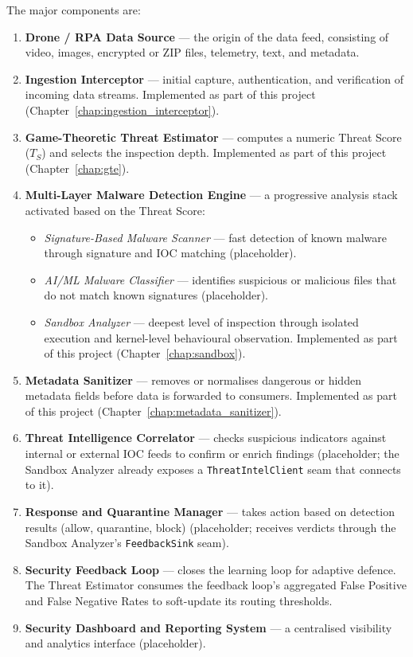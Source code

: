 \documentclass[12pt, a4paper]{report}
\begin{document}
The major components are:
\begin{enumerate}
    \item \textbf{Drone / RPA Data Source} --- the origin of the data feed,
          consisting of video, images, encrypted or ZIP files, telemetry,
          text, and metadata.
    \item \textbf{Ingestion Interceptor} --- initial capture,
          authentication, and verification of incoming data streams.
          Implemented as part of this project
          (Chapter~\ref{chap:ingestion_interceptor}).
    \item \textbf{Game-Theoretic Threat Estimator} --- computes a numeric
          Threat Score ($T_S$) and selects the inspection depth.
          Implemented as part of this project (Chapter~\ref{chap:gte}).
    \item \textbf{Multi-Layer Malware Detection Engine} --- a progressive
          analysis stack activated based on the Threat Score:
          \begin{itemize}
              \item \emph{Signature-Based Malware Scanner} --- fast
                    detection of known malware through signature and IOC
                    matching (placeholder).
              \item \emph{AI/ML Malware Classifier} --- identifies
                    suspicious or malicious files that do not match known
                    signatures (placeholder).
              \item \emph{Sandbox Analyzer} --- deepest level of inspection
                    through isolated execution and kernel-level behavioural
                    observation. Implemented as part of this project
                    (Chapter~\ref{chap:sandbox}).
          \end{itemize}
    \item \textbf{Metadata Sanitizer} --- removes or normalises dangerous
          or hidden metadata fields before data is forwarded to consumers.
          Implemented as part of this project
          (Chapter~\ref{chap:metadata_sanitizer}).
    \item \textbf{Threat Intelligence Correlator} --- checks suspicious
          indicators against internal or external IOC feeds to confirm or
          enrich findings (placeholder; the Sandbox Analyzer already
          exposes a \texttt{ThreatIntelClient} seam that connects to it).
    \item \textbf{Response and Quarantine Manager} --- takes action based
          on detection results (allow, quarantine, block) (placeholder;
          receives verdicts through the Sandbox Analyzer's
          \texttt{FeedbackSink} seam).
    \item \textbf{Security Feedback Loop} --- closes the learning loop for
          adaptive defence. The Threat Estimator consumes the feedback
          loop's aggregated False Positive and False Negative Rates to
          soft-update its routing thresholds.
    \item \textbf{Security Dashboard and Reporting System} --- a
          centralised visibility and analytics interface (placeholder).
\end{enumerate}
\end{document}
